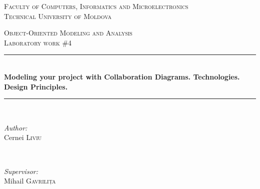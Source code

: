 \documentclass[12pt,a4paper,titlepage]{article}
\begin{document}
\begin{titlepage}

  \begin{center} %

  \textsc{\large Faculty of Computers, Informatics and Microelectronics}\\[0.5cm]
  \textsc{\large Technical University of Moldova}\\[1.2cm] %
  \vspace{25 mm}

  \textsc{\Large Object-Oriented Modeling and Analysis}\\[0.5cm] %
  \textsc{\large Laboratory work \#4}\\[0.5cm] %

\newcommand{\HRule}{\rule{\linewidth}{0.5mm}} %

  \vspace{10 mm}
  \HRule \\[0.4cm]
  { \LARGE \bfseries Modeling your project with Collaboration Diagrams. Technologies. Design Principles. }\\[0.4cm] %
  \HRule \\[1.5cm]

      \vspace{30mm}

      \begin{minipage}{0.4\textwidth}
      \begin{flushleft} \large
      \emph{Author:}\\
      Cernei \textsc{Liviu}
      \end{flushleft}
      \end{minipage}
      ~
      \begin{minipage}{0.4\textwidth}
      \begin{flushright} \large
      \emph{Supervisor:} \\
      Mihail \textsc{Gavrilița} %
      \end{flushright}
      \end{minipage}\\[4cm]


\end{center}
\end{titlepage}
\end{document}
